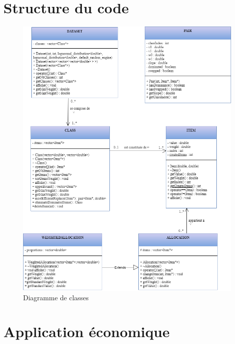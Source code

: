 \documentclass{article}
\begin{document}
\section{Structure du code}

\begin{figure}[!ht]
	\centering
	\includegraphics[width=14cm]{KnapsackClasses.png}
	\caption{Diagramme de classes}
	\label{fig:diagramme}
\end{figure}

\section{Application économique}
\end{document}
